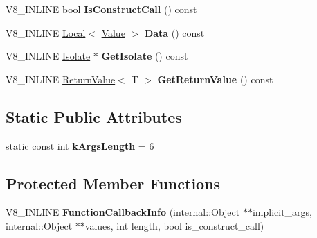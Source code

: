 \begin{DoxyCompactItemize}
\item 
\hypertarget{classv8_1_1_function_callback_info_a8b89715c355b707efd3d2bcf21e64d9e}{}V8\+\_\+\+I\+N\+L\+I\+N\+E bool {\bfseries Is\+Construct\+Call} () const \label{classv8_1_1_function_callback_info_a8b89715c355b707efd3d2bcf21e64d9e}

\item 
\hypertarget{classv8_1_1_function_callback_info_a1475dcc776c8fdd68eb1be08cd29e5ac}{}V8\+\_\+\+I\+N\+L\+I\+N\+E \hyperlink{classv8_1_1_local}{Local}$<$ \hyperlink{classv8_1_1_value}{Value} $>$ {\bfseries Data} () const \label{classv8_1_1_function_callback_info_a1475dcc776c8fdd68eb1be08cd29e5ac}

\item 
\hypertarget{classv8_1_1_function_callback_info_a3b5fe01205c99dca06e388c3d390a40e}{}V8\+\_\+\+I\+N\+L\+I\+N\+E \hyperlink{classv8_1_1_isolate}{Isolate} $\ast$ {\bfseries Get\+Isolate} () const \label{classv8_1_1_function_callback_info_a3b5fe01205c99dca06e388c3d390a40e}

\item 
\hypertarget{classv8_1_1_function_callback_info_abf851b51557b0507ab69c494fddbb3c3}{}V8\+\_\+\+I\+N\+L\+I\+N\+E \hyperlink{classv8_1_1_return_value}{Return\+Value}$<$ T $>$ {\bfseries Get\+Return\+Value} () const \label{classv8_1_1_function_callback_info_abf851b51557b0507ab69c494fddbb3c3}

\end{DoxyCompactItemize}
\subsection*{Static Public Attributes}
\begin{DoxyCompactItemize}
\item 
\hypertarget{classv8_1_1_function_callback_info_a1e5248c2d40840270829882feaaa9d34}{}static const int {\bfseries k\+Args\+Length} = 6\label{classv8_1_1_function_callback_info_a1e5248c2d40840270829882feaaa9d34}

\end{DoxyCompactItemize}
\subsection*{Protected Member Functions}
\begin{DoxyCompactItemize}
\item 
\hypertarget{classv8_1_1_function_callback_info_a998514a21aac39525ffb8644dd1cec26}{}V8\+\_\+\+I\+N\+L\+I\+N\+E {\bfseries Function\+Callback\+Info} (internal\+::\+Object $\ast$$\ast$implicit\+\_\+args, internal\+::\+Object $\ast$$\ast$values, int length, bool is\+\_\+construct\+\_\+call)\label{classv8_1_1_function_callback_info_a998514a21aac39525ffb8644dd1cec26}

\end{DoxyCompactItemize}
